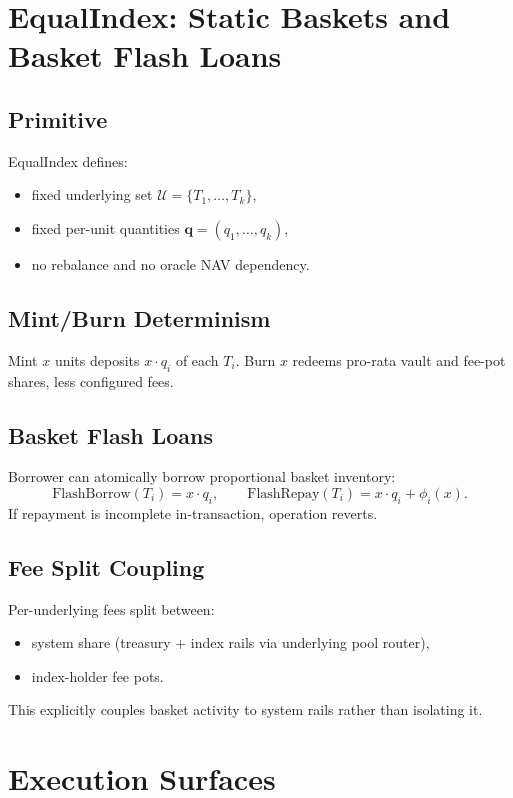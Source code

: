 \documentclass[version=preprint]{iacrcc}
\begin{document}
\section{EqualIndex: Static Baskets and Basket Flash Loans}

\subsection{Primitive}

EqualIndex defines:
\begin{itemize}
  \item fixed underlying set $\mathcal{U}=\{T_1,\dots,T_k\}$,
  \item fixed per-unit quantities $\mathbf{q}=(q_1,\dots,q_k)$,
  \item no rebalance and no oracle NAV dependency.
\end{itemize}

\subsection{Mint/Burn Determinism}

Mint $x$ units deposits $x \cdot q_i$ of each $T_i$. Burn $x$ redeems pro-rata vault and fee-pot shares, less configured fees.

\subsection{Basket Flash Loans}

Borrower can atomically borrow proportional basket inventory:
\[
\text{FlashBorrow}(T_i) = x\cdot q_i, \qquad
\text{FlashRepay}(T_i) = x\cdot q_i + \phi_i(x).
\]
If repayment is incomplete in-transaction, operation reverts.

\subsection{Fee Split Coupling}

Per-underlying fees split between:
\begin{itemize}
  \item system share (treasury + index rails via underlying pool router),
  \item index-holder fee pots.
\end{itemize}

This explicitly couples basket activity to system rails rather than isolating it.

\section{Execution Surfaces}
\end{document}

